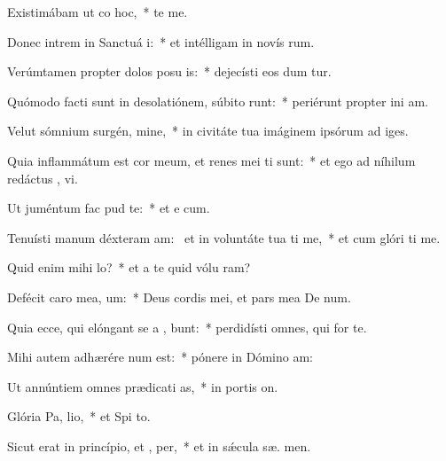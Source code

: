 \item Existimábam ut co hoc,~*   te me.
\item Donec intrem in Sanctuá i:~* et intélligam in novís rum.
\item Verúmtamen propter dolos posu is:~* dejecísti eos dum tur.
\item Quómodo facti sunt in desolatiónem, súbito runt:~* periérunt propter ini am.
\item Velut sómnium surgén, mine,~* in civitáte tua imáginem ipsórum ad  iges.
\item Quia inflammátum est cor meum, et renes mei ti sunt:~* et ego ad níhilum redáctus ,  vi.
\item Ut juméntum fac  pud te:~* et e  cum.
\item Tenuísti manum déxteram am:~\pscross{} et in voluntáte tua ti me,~* et cum glóri ti me.
\item Quid enim mihi   lo?~* et a te quid vólu  ram?
\item Defécit caro mea,   um:~* Deus cordis mei, et pars mea De  num.
\item Quia ecce, qui elóngant se a , bunt:~* perdidísti omnes, qui for  te.
\item Mihi autem adhærére  num est:~* pónere in Dómino   am:
\item Ut annúntiem omnes prædicati as,~* in portis  on.
\item Glória Pa,  lio,~* et Spi to.
\item Sicut erat in princípio, et ,  per,~* et in sǽcula sæ. men.
